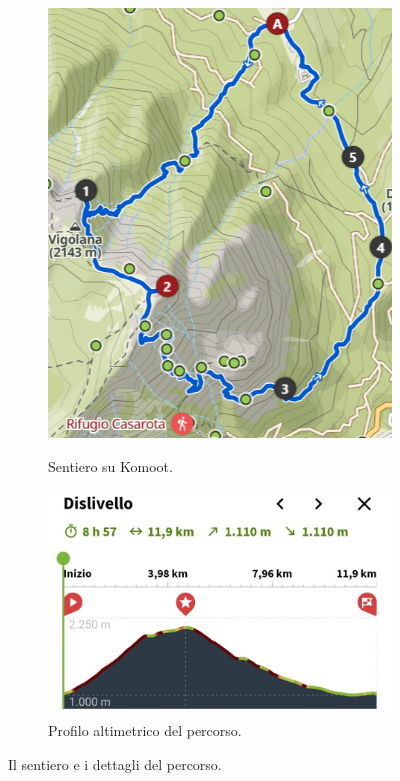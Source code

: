 \documentclass{article}
\begin{document}
\begin{figure}[htbp!]
\begin{subfigure}[t]{0.45\textwidth}
        \includegraphics[width=\textwidth]{images/sentiero_komoot.png}
        \caption{Sentiero su Komoot.}
        \label{fig:foto_corta1}
        \vspace{1em} %
        \includegraphics[width=\textwidth]{images/profilo_altimetrico.jpg}
        \caption{Profilo altimetrico del percorso.}
        \label{fig:foto_corta2}
    \end{subfigure}
    \caption{Il sentiero e i dettagli del percorso.}
    \label{fig:panoramica_dettagli}
\end{figure}
\end{document}
